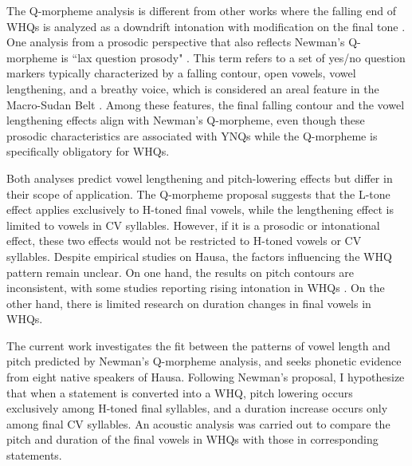 \documentclass[output=paper,colorlinks,citecolor=brown
]{langscibook}
\begin{document}


The Q-morpheme analysis is different from other works where the falling end of WHQs is analyzed as a downdrift intonation with modification on the final tone \citep{miller, lindau1986}. One analysis from a prosodic perspective that also reflects Newman's Q-morpheme is ``lax question prosody" \citep{ClementRialland2008,rialland2009lax}. This term refers to a set of yes/no question markers typically characterized by a falling contour, open vowels, vowel lengthening, and a breathy voice, which is considered an areal feature in the Macro-Sudan Belt \citep{rialland2009lax, Guldemann2008, Guldemann2018}. Among these features, the final falling contour and the vowel lengthening effects align with Newman's Q-morpheme, even though these prosodic characteristics are associated with YNQs while the Q-morpheme is specifically obligatory for WHQs.

Both analyses predict vowel lengthening and pitch-lowering effects but differ in their scope of application. The Q-morpheme proposal suggests that the L-tone effect applies exclusively to H-toned final vowels, while the lengthening effect is limited to vowels in CV syllables. However, if it is a prosodic or intonational effect, these two effects would not be restricted to H-toned vowels or CV syllables. Despite empirical studies on Hausa, the factors influencing the WHQ pattern remain unclear. On one hand, the results on pitch contours are inconsistent, with some studies reporting rising intonation in WHQs \citep{dresel1977,meyers1976aspects}. On the other hand, there is limited research on duration changes in final vowels in WHQs.

The current work investigates the fit between the patterns of vowel length and pitch predicted by Newman's Q-morpheme analysis, and seeks phonetic evidence from eight native speakers of Hausa. Following Newman's proposal, I hypothesize that when a statement is converted into a WHQ, pitch lowering occurs exclusively among H-toned final syllables, and a duration increase occurs only among final CV syllables. An acoustic analysis was carried out to compare the pitch and duration of the final vowels in WHQs with those in corresponding statements.  
\end{document}
